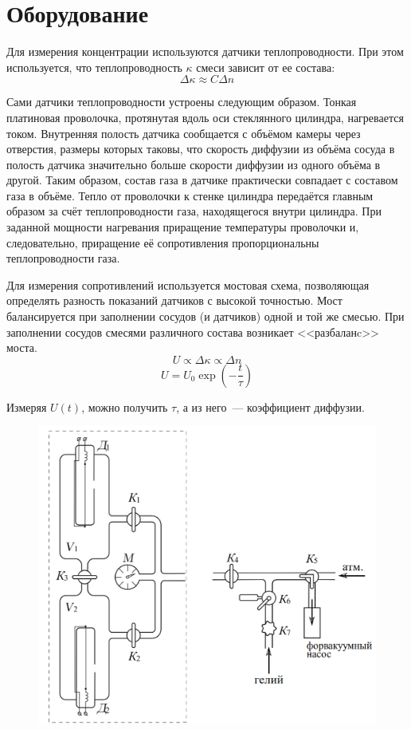 \section{Оборудование}
Для измерения концентрации используются датчики теплопроводности. При этом используется, что
теплопроводность $\kappa$ смеси зависит от ее состава:
\[\Delta \kappa\approx C\Delta n\]

Сами датчики теплопроводности устроены следующим образом. Тонкая
платиновая проволочка, протянутая вдоль оси стеклянного цилиндра,
нагревается током. Внутренняя полость датчика сообщается с объёмом
камеры через отверстия, размеры которых таковы, что скорость диффузии
из объёма сосуда в полость датчика значительно больше скорости диффузии
из одного объёма в другой. Таким образом, состав газа в датчике практически
совпадает с составом газа в объёме. Тепло от проволочки к стенке
цилиндра передаётся главным образом за счёт теплопроводности газа, находящегося
внутри цилиндра. При заданной мощности нагревания приращение температуры
проволочки и, следовательно, приращение её сопротивления пропорциональны
теплопроводности газа.

Для измерения сопротивлений используется мостовая схема, позволяющая
определять разность показаний датчиков с высокой точностью.
Мост балансируется при заполнении сосудов (и датчиков) одной и той же
смесью. При заполнении сосудов смесями различного состава возникает
<<разбаланc>> моста.
\[U\varpropto \Delta\kappa \varpropto \Delta n\]
\[U=U_0\exp\left(-\frac{t}{\tau}\right)\]

Измеряя $U(t)$, можно получить $\tau$, а из него~--- коэффициент диффузии.

\begin{figure}[ht!]
    \centering\includegraphics[width=0.8\linewidth]{img/eq1.png}
\end{figure}

